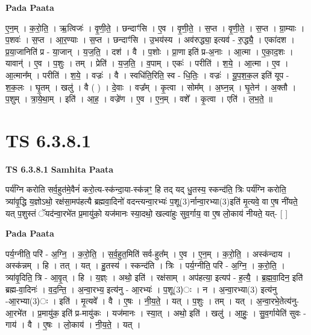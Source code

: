 \documentclass[17pt]{extarticle}
\begin{document}
\textbf{Pada Paata} \newline

ए॒न॒म् । क॒रो॒ति॒ । ऋ॒त्विजः॑ । वृ॒णी॒ते॒ । छन्दाꣳ॑सि । ए॒व । वृ॒णी॒ते॒ । स॒प्त । वृ॒णी॒ते॒ । स॒प्त । ग्रा॒म्याः । प॒शवः॑ । स॒प्त । आ॒र॒ण्याः । स॒प्त । छन्दाꣳ॑सि । उ॒भय॑स्य । अव॑रुद्ध्या॒ इत्यव॑ - रु॒द्ध्यै॒ । एका॑दश । प्र॒या॒जानिति॑ प्र - या॒जान् । य॒ज॒ति॒ । दश॑ । वै । प॒शोः । प्रा॒णा इति॑ प्र-अ॒नाः । आ॒त्मा । ए॒का॒द॒शः । यावान्॑ । ए॒व । प॒शुः । तम् । प्रेति॑ । य॒ज॒ति॒ । व॒पाम् । एकः॑ । परीति॑ । श॒ये॒ । आ॒त्मा । ए॒व । आ॒त्मान᳚म् । परीति॑ । श॒ये॒ । वज्रः॑ । वै । स्वधि॑ति॒रिति॒ स्व - धि॒तिः॒ । वज्रः॑ । यू॒प॒श॒क॒ल इति॑ यूप - श॒क॒लः । घृ॒तम् । खलु॑ । वै ( ) । दे॒वाः । वज्र᳚म् । कृ॒त्वा । सोम᳚म् । अ॒घ्न॒न्न् । घृ॒तेन॑ । अ॒क्तौ । प॒शुम् । त्रा॒ये॒था॒म् । इति॑ । आ॒ह॒ । वज्रे॑ण । ए॒व । ए॒न॒म् । वशे᳚ । कृ॒त्वा । एति॑ । ल॒भ॒ते॒ ॥  \newline





\section{ TS 6.3.8.1 }

\textbf{TS 6.3.8.1 } \newline
\textbf{Samhita Paata} \newline

पर्य॑ग्नि करोति सर्व॒हुत॑मे॒वैनं॑ करो॒त्य-स्क॑न्दा॒या-स्क॑न्नꣳ॒॒ हि तद् यद् धु॒तस्य॒ स्कन्द॑ति॒ त्रिः पर्य॑ग्नि करोति॒ त्र्या॑वृ॒द्धि य॒ज्ञोऽथो॒ रक्ष॑सा॒मप॑हत्यै ब्रह्मवा॒दिनो॑ वदन्त्यन्वा॒रभ्यः॑ प॒शू(3)र्नान्वा॒रभ्या(3)इति॑ मृ॒त्यवे॒ वा ए॒ष नी॑यते॒ यत् प॒शुस्तं ॅयद॑न्वा॒रभे॑त प्र॒मायु॑को॒ यज॑मानः स्या॒दथो॒ खल्वा॑हुः सुव॒र्गाय॒ वा ए॒ष लो॒काय॑ नीयते॒ यत्- [  ] \newline

\textbf{Pada Paata} \newline

पर्य॒ग्नीति॒ परि॑ - अ॒ग्नि॒ । क॒रो॒ति॒ । स॒र्व॒हुत॒मिति॑ सर्व-हुत᳚म् । ए॒व । ए॒न॒म् । क॒रो॒ति॒ । अस्क॑न्दाय । अस्क॑न्नम् । हि । तत् । यत् । हु॒तस्य॑ । स्कन्द॑ति । त्रिः । पर्य॒ग्नीति॒ परि॑ - अ॒ग्नि॒ । क॒रो॒ति॒ । त्र्या॑वृ॒दिति॒ त्रि - आ॒वृ॒त् । हि । य॒ज्ञ्ः । अथो॒ इति॑ । रक्ष॑साम् । अप॑हत्या॒ इत्यप॑ - ह॒त्यै॒ । ब्र॒ह्म॒वा॒दिन॒ इति॑ ब्रह्म-वा॒दिनः॑ । व॒द॒न्ति॒ । अ॒न्वा॒रभ्य॒ इत्य॑नु - आ॒रभ्यः॑ । प॒शू(3)ः । न । अ॒न्वा॒रभ्या(3) इत्य॑नु -आ॒रभ्या(3)ः । इति॑ । मृ॒त्यवे᳚ । वै । ए॒षः । नी॒य॒ते॒ । यत् ।  प॒शुः । तम् । यत् । अ॒न्वा॒रभे॒तेत्य॑नु-आ॒रभे॑त । प्र॒मायु॑क॒ इति॑ प्र-मायु॑कः । यज॑मानः । स्या॒त् । अथो॒ इति॑ । खलु॑ । आ॒हुः॒ । सु॒व॒र्गायेति॑ सुवः - गाय॑ । वै । ए॒षः । लो॒काय॑ । नी॒य॒ते॒ । यत् ।  \newline
\end{document}

